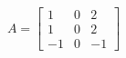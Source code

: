 \documentclass[preview]{standalone}
\begin{document}
\begin{align*}
A = \begin{bmatrix} 1 & 0 & 2 \\ 1 & 0 & 2 \\ -1 & 0 & -1 \end{bmatrix}
\end{align*}
\end{document}

